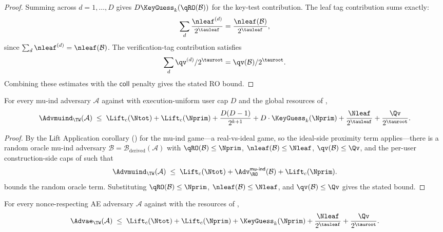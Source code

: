 \begin{proof}
Summing across $d = 1,\dots,D$ gives
$D \KeyGuess_k(\qRO(\mathcal{B}))$ for the key-test contribution. The
leaf tag contribution sums exactly:
\[
  \sum_d \frac{\nleaf^{(d)}}{2^{\tauleaf}}
  = \frac{\nleaf(\mathcal{B})}{2^{\tauleaf}},
\]
since $\sum_d \nleaf^{(d)} = \nleaf(\mathcal{B})$. The
verification-tag contribution satisfies
\[
  \sum_d \qv^{(d)} / 2^{\tauroot}
  = \qv(\mathcal{B}) / 2^{\tauroot}.
\]
Combining these estimates with the $\mathsf{coll}$ penalty gives the
stated RO bound.
\end{proof}

\begin{theorem}
\label{thm:mu-ind}
For every mu-ind adversary $\mathcal{A}$ against \TW{} with
execution-uniform user cap $D$ and the global resources of
,
\[
  \Advmuind_\TW(\mathcal{A})
  \;\leq\;
  \Lift_c(\Ntot)
  + \Lift_c(\Nprim)
  + \frac{D(D - 1)}{2^{k + 1}}
  + D \cdot \KeyGuess_k(\Nprim)
  + \frac{\Nleaf}{2^{\tauleaf}}
  + \frac{\Qv}{2^{\tauroot}}.
\]
\end{theorem}

\begin{proof}
By the Lift Application corollary () for the
mu-ind game---a real-vs-ideal game, so the ideal-side proximity term
applies---there is a random oracle mu-ind adversary
$\mathcal{B} = \mathcal{B}_{\mathrm{derived}}(\mathcal{A})$ with
$\qRO(\mathcal{B}) \leq \Nprim$, $\nleaf(\mathcal{B}) \leq \Nleaf$,
$\qv(\mathcal{B}) \leq \Qv$, and the per-user construction-side caps of
 such that
\[
  \Advmuind_\TW(\mathcal{A})
  \;\leq\;
  \Lift_c(\Ntot) + \Adv^{\mathsf{mu\text{-}ind}}_{\RO}(\mathcal{B})
  + \Lift_c(\Nprim).
\]
 bounds the random oracle term. Substituting
$\qRO(\mathcal{B}) \leq \Nprim$,
$\nleaf(\mathcal{B}) \leq \Nleaf$, and
$\qv(\mathcal{B}) \leq \Qv$ gives the stated bound.
\end{proof}

\begin{corollary}
\label{cor:ae}
For every nonce-respecting AE adversary $\mathcal{A}$ against \TW{}
with the resources of ,
\[
  \Advae_\TW(\mathcal{A})
  \;\leq\;
  \Lift_c(\Ntot)
  + \Lift_c(\Nprim)
  + \KeyGuess_k(\Nprim)
  + \frac{\Nleaf}{2^{\tauleaf}}
  + \frac{\Qv}{2^{\tauroot}}.
\]
\end{corollary}

